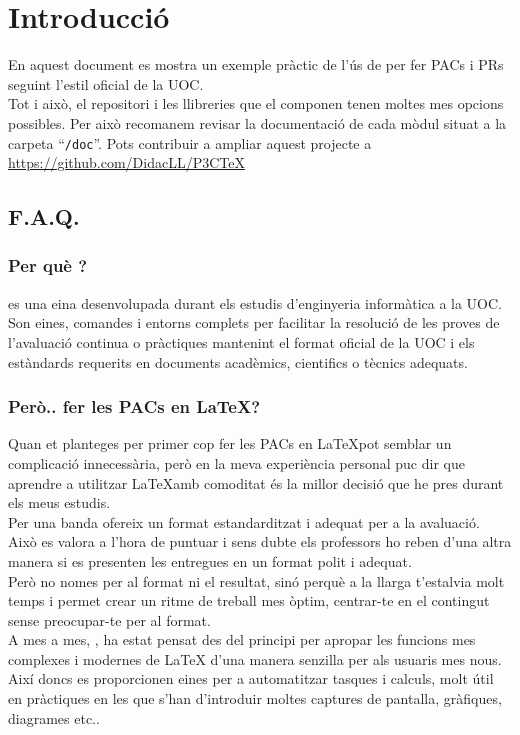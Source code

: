 \documentclass[cover,toc,default]{P3CTeX} %
\begin{document}
\section*{Introducció} %

	En aquest document es mostra un exemple pràctic de l'ús de \PECTeX
	per fer PACs i PRs seguint l'estil oficial de la UOC.
	\bigskip\\ %
	Tot i això, el repositori \PECTeX i les llibreries que el componen
	tenen moltes mes opcions possibles. Per això recomanem revisar la
	documentació de cada mòdul situat a la carpeta ``\texttt{/doc}''. %
	Pots contribuir a ampliar aquest projecte a \url{https://github.com/DidacLL/P3CTeX}
	\subsection*{F.A.Q.}
	\pxHRule*[.6\linewidth] %
		\subsubsection*{Per què \PECTeX?}
			\PECTeX es una eina desenvolupada durant els estudis d'enginyeria informàtica a la UOC.
			 Son eines, comandes i entorns complets per facilitar la resolució de les proves de
			 l'avaluació continua o pràctiques mantenint el format oficial de la UOC i els estàndards
			 requerits en documents acadèmics, cientifics o tècnics adequats.
		\subsubsection*{Però.. fer les PACs en \LaTeX ?}
			Quan et planteges per primer cop fer les PACs en \LaTeX pot semblar un complicació innecessària,
			 però en la meva experiència personal puc dir que aprendre a utilitzar \LaTeX amb comoditat és
			 la millor decisió que he pres durant els meus estudis.
			\\
			Per una banda ofereix un format estandarditzat i adequat per a la avaluació. Això es valora a l'hora
			 de puntuar i sens dubte els professors ho reben d'una altra manera si es presenten les
			  entregues en un format polit i adequat.
			\\
			Però no nomes per al format ni el resultat, sinó perquè a la llarga t'estalvia molt temps i permet crear
			 un ritme de treball mes òptim, centrar-te en el contingut sense preocupar-te per al format.
			\bigskip\\
			A mes a mes, \PECTeX, ha estat pensat des del principi per apropar les funcions mes complexes i modernes de \LaTeX
			d'una manera senzilla per als usuaris mes nous. Així doncs es proporcionen eines per a automatitzar tasques i calculs,
			molt útil en pràctiques en les que s'han d'introduir moltes captures de pantalla, gràfiques, diagrames etc..
\end{document}
